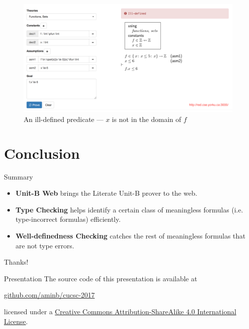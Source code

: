 \documentclass[11pt]{beamer}
\newcommand{\unitb}{Unit-B\xspace}
\begin{document}
\begin{frame}[plain]
  \begin{figure}
    \centering
    \includegraphics[width=\textwidth]{img/unitb_wd.png}
    \caption{An ill-defined predicate --- $x$ is not in
                  the domain of $f$}\label{fig:wd}
  \end{figure}
\end{frame}


\section{Conclusion}

\begin{frame}{Summary}

  \begin{itemize}[<+->]
  \item \textbf{\unitb Web} brings the Literate Unit-B prover to the web.
  \item \textbf{Type Checking} helps identify a certain class of
    meaningless formulas (i.e. type-incorrect formulas) efficiently.
  \item \textbf{Well-definedness Checking} catches the rest of
    meaningless formulas that are not type errors.
  \end{itemize}

\end{frame}

\begin{frame}[standout]
  \LARGE Thanks!
\end{frame}

\appendix

\begin{frame}[fragile]{Presentation}
  The source code of this presentation is available at

  \begin{center}
    \href{https://github.com/aminb/cucsc-2017}{\url{github.com/aminb/cucsc-2017}}
  \end{center}

  licensed under a
  \href{http://creativecommons.org/licenses/by-sa/4.0/}{Creative Commons
  Attribution-ShareAlike 4.0 International License}.

  \begin{center}\ccbysa\end{center}
\end{frame}
\end{document}

